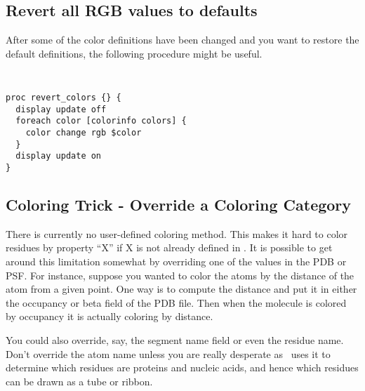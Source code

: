\subsection{Revert all RGB values to defaults}
\label{ug:topic:coloring:scripts:revert}
After some of the color definitions have been changed and you want to
restore the default definitions, the following procedure might be useful.

{\tt 
\begin{verbatim}
proc revert_colors {} { 
  display update off
  foreach color [colorinfo colors] {
    color change rgb $color
  }
  display update on
}
\end{verbatim}
}

\subsection{Coloring Trick - Override a Coloring Category}

There is currently no user-defined coloring method.  This makes it
hard to color residues by property ``X'' if X is not already defined
in \VMD.  It is possible to get around this limitation somewhat by
overriding one of the values in the PDB or PSF.  For instance, suppose
you wanted to color the atoms by the distance of the atom from a given
point.  One way is to compute the distance and put it in either the
occupancy or beta field of the PDB file.  Then when the molecule is
colored by occupancy it is actually coloring by distance.

You could also override, say, the segment name field or even the
residue name.  Don't override the atom name unless you are really
desperate as \VMD\ uses it to determine which residues are proteins and
nucleic acids, and hence which residues can be drawn as a tube or
ribbon.


